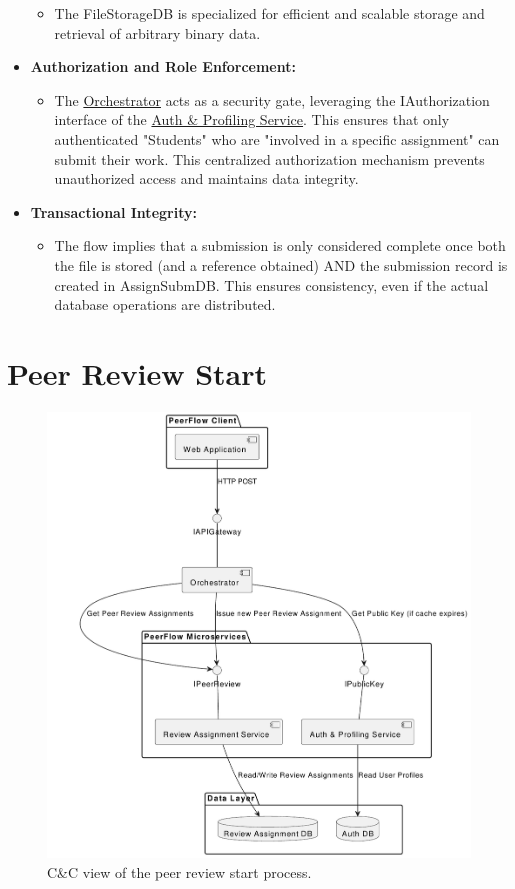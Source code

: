 \begin{itemize}
\begin{itemize}
        \item The FileStorageDB is specialized for efficient and scalable storage and retrieval of arbitrary binary data.
    \end{itemize}
    \item \textbf{Authorization and Role Enforcement:}
    \begin{itemize}
        \item The \hyperref[def:Orchestrator]{Orchestrator} acts as a security gate, leveraging the IAuthorization interface of the \hyperref[def:AuthProfilingService]{Auth \& Profiling Service}. This ensures that only authenticated "Students" who are "involved in a specific assignment" can submit their work. This centralized authorization mechanism prevents unauthorized access and maintains data integrity.
    \end{itemize}
    \item \textbf{Transactional Integrity:}
    \begin{itemize}
        \item The flow implies that a submission is only considered complete once both the file is stored (and a reference obtained) AND the submission record is created in AssignSubmDB. This ensures consistency, even if the actual database operations are distributed.
    \end{itemize}
\end{itemize}


\clearpage

\section{Peer Review Start}

\begin{figure}[h]
    \centering
    \includegraphics[width=0.7\linewidth]{Architettura/imgs/pr_start_cnc.pdf}
    \caption{C\&C view of the peer review start process.}
    \label{fig:ccPeerReviewStart}
\end{figure}
\clearpage

